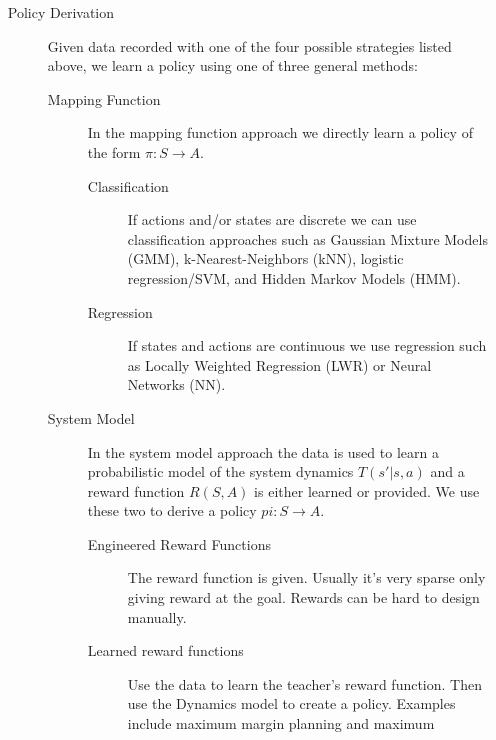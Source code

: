 \begin{enumerate}
\begin{description}
\begin{description}
\begin{description}
                    \end{description} 
            \end{description} 
        \item[Policy Derivation]
            Given data recorded with one of the four possible strategies listed
            above, we learn a policy using one of three general methods:
            \begin{description}
                \item[Mapping Function] 
                    In the mapping function approach we directly learn a policy
                    of the form $\pi: S \rightarrow A$.
                    \begin{description}
                        \item[Classification]
                            If actions and/or states are discrete we can use
                            classification approaches such as Gaussian Mixture
                            Models (GMM), k-Nearest-Neighbors (kNN), logistic
                            regression/SVM, and Hidden Markov Models
                            (HMM).
                        \item[Regression]
                            If states and actions are continuous we use
                            regression such as Locally Weighted Regression
                            (LWR) or Neural Networks (NN).
                    \end{description}
                \item[System Model] 
                    In the system model approach the data is used to learn a
                    probabilistic model of the system dynamics $T(s'| s, a)$ and
                    a reward function $R(S, A)$ is either learned or provided.
                    We use these two to derive a policy $pi: S \rightarrow A$. 
                    \begin{description}
                        \item[Engineered Reward Functions]  
                            The reward function is given. Usually it's very
                            sparse only giving reward at the goal. Rewards can
                            be hard to design manually.
                        \item[Learned reward functions]
                            Use the data to learn the teacher's reward function.
                            Then use the Dynamics model to create a policy.
                            Examples include maximum margin planning and maximum

\end{description}
\end{description}
\end{description}
\end{enumerate}
